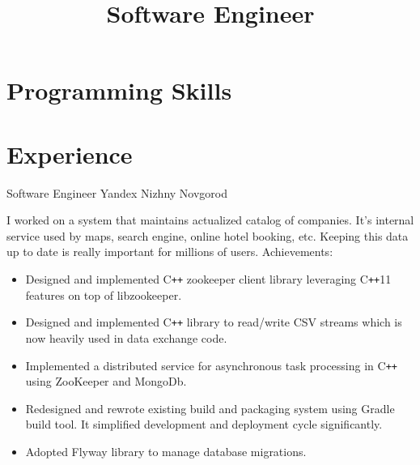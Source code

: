 \documentclass[11pt,a4paper,sans]{moderncv}
\title{Software Engineer}
\newcommand{\Cpp}{C{}\texttt{++}}
\begin{document}
\makecvtitle

\section{Programming Skills}
\cvitem{Proficient}{\Cpp{}, C, Java}

\section{Experience}
{Software Engineer}
{Yandex}
{Nizhny Novgorod}
{}
{I worked on a system that maintains actualized catalog of
companies.  It's internal service used by maps, search engine, online
hotel booking, etc.  Keeping this data up to date is really important
for millions of users.
\newline{}
Achievements:
\begin{itemize}
\item Designed and implemented \Cpp{} zookeeper client library leveraging
  \Cpp{}11 features on top of libzookeeper.
\item Designed and implemented \Cpp{} library to read/write CSV streams
  which is now heavily used in data exchange code.
\item Implemented a distributed service for asynchronous task
  processing in \Cpp{} using ZooKeeper and MongoDb.
\item Redesigned and rewrote existing build and packaging system using
  Gradle build tool. It simplified development and deployment cycle
  significantly.
\item Adopted Flyway library to manage database migrations.
\end{itemize}
}
\end{document}
